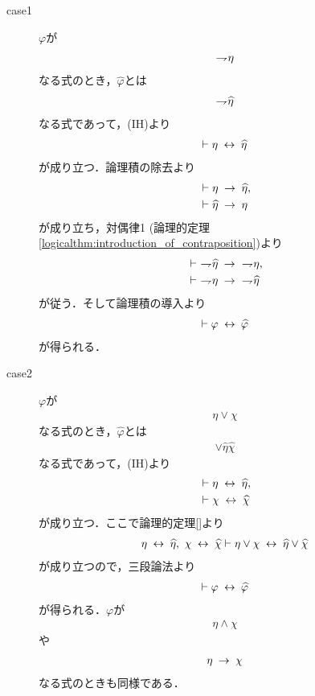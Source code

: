 \begin{sketch}
\begin{description}
			\begin{description}
				\item[case1] $\varphi$が
					\begin{align}
						\rightharpoondown\hspace{-0.25em} \eta
					\end{align}
					なる式のとき，$\widehat{\varphi}$とは
					\begin{align}
						\rightharpoondown\hspace{-0.25em} \widehat{\eta}
					\end{align}
					なる式であって，(IH)より
					\begin{align}
						\vdash \eta \hspace{0.25em}\leftrightarrow\hspace{0.25em} \widehat{\eta}
					\end{align}
					が成り立つ．論理積の除去より
					\begin{align}
						&\vdash \eta \hspace{0.25em}\rightarrow\hspace{0.25em} \widehat{\eta}, \\
						&\vdash \widehat{\eta} \hspace{0.25em}\rightarrow\hspace{0.25em} \eta
					\end{align}
					が成り立ち，対偶律1 (論理的定理\ref{logicalthm:introduction_of_contraposition})より
					\begin{align}
						&\vdash\ \negation \widehat{\eta} \rarrow\ \negation \eta, \\
						&\vdash\ \negation \eta \rarrow\ \negation \widehat{\eta}
					\end{align}
					が従う．そして論理積の導入より
					\begin{align}
						\vdash \varphi \hspace{0.25em}\leftrightarrow\hspace{0.25em} \widehat{\varphi}
					\end{align}
					が得られる．
					
				\item[case2] 
					$\varphi$が
					\begin{align}
						\eta \vee \chi
					\end{align}
					なる式のとき，$\widehat{\varphi}$とは
					\begin{align}
						\vee \widehat{\eta} \widehat{\chi}
					\end{align}
					なる式であって，(IH)より
					\begin{align}
						&\vdash \eta \hspace{0.25em}\leftrightarrow\hspace{0.25em} \widehat{\eta}, \\
						&\vdash \chi \hspace{0.25em}\leftrightarrow\hspace{0.25em} \widehat{\chi}
					\end{align}
					が成り立つ．ここで論理的定理\ref{}より
					\begin{align}
						\eta \hspace{0.25em}\leftrightarrow\hspace{0.25em} \widehat{\eta},\ \chi \hspace{0.25em}\leftrightarrow\hspace{0.25em} \widehat{\chi} \vdash 
						\eta \vee \chi \hspace{0.25em}\leftrightarrow\hspace{0.25em} \widehat{\eta} \vee \widehat{\chi}
					\end{align}
					が成り立つので，三段論法より
					\begin{align}
						\vdash \varphi \hspace{0.25em}\leftrightarrow\hspace{0.25em} \widehat{\varphi}
					\end{align}
					が得られる．$\varphi$が
					\begin{align}
						\eta \wedge \chi
					\end{align}
					や
					\begin{align}
						\eta \hspace{0.25em}\rightarrow\hspace{0.25em} \chi
					\end{align}
					なる式のときも同様である．
					

\end{description}
\end{description}
\end{sketch}
